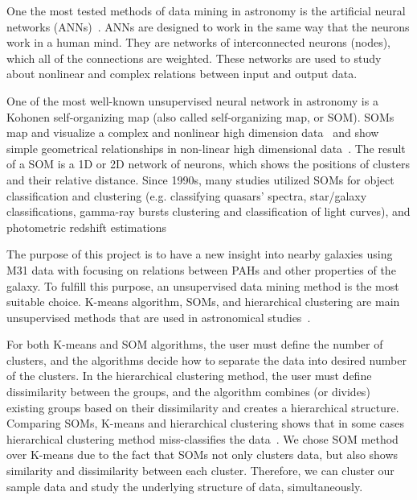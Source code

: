 One the most tested methods of data mining in astronomy is the artificial neural networks (ANNs)~\citep[e.g.][and references therein]{Hossein12, Hossein14,Hossein16,Ellison16a}.
ANNs are designed to work in the same way that the neurons work in a human mind.
They are networks of interconnected neurons (nodes), which all of the connections are weighted.
These networks are used to study about nonlinear and complex relations between input and output data.

One of the most well-known unsupervised neural network in astronomy is a Kohonen self-organizing map (also called self-organizing map, or SOM).
SOMs map and visualize a complex and nonlinear high dimension data~\citep{Kohonen82} and show simple geometrical relationships in non-linear high dimensional data~\citep{Kohonen98}.
The result of a SOM is a 1D or 2D network of neurons, which shows the positions of clusters and their relative distance.
Since 1990s, many studies utilized SOMs for object classification and clustering (e.g. classifying quasars' spectra, star/galaxy classifications, gamma-ray bursts clustering and classification of light curves), and photometric redshift estimations~\citep[e.g.][]{Odewahn92, Hernandez94, Murtagh95, Maehoenen95,Scaringi09,Geach12,Fustes13,Meusinger16,Rahmani16b} %

The purpose of this project is to have a new insight into nearby galaxies using M31 data with focusing on relations between PAHs and other properties of the galaxy.
To fulfill this purpose, an unsupervised data mining method is the most suitable choice. %
K-means algorithm, SOMs, and hierarchical clustering are main unsupervised methods that are used in astronomical studies~\citep[e.g.][]{DAbrusco12, Aycha16}. %

For both K-means and SOM algorithms, the user must define the number of clusters, and the algorithms decide how to separate the data into desired number of the clusters.
In the hierarchical clustering method, the user must define dissimilarity between the groups, and the algorithm combines (or divides) existing groups based on their dissimilarity and creates a hierarchical structure. 
Comparing SOMs, K-means and hierarchical clustering shows that in some cases hierarchical clustering method miss-classifies the data~\citep[][and references therein]{Mangiameli96}.
We chose SOM method over K-means due to the fact that SOMs not only clusters data, but also shows similarity and dissimilarity between each cluster.
Therefore, we can cluster our sample data and study the underlying structure of data, simultaneously.

